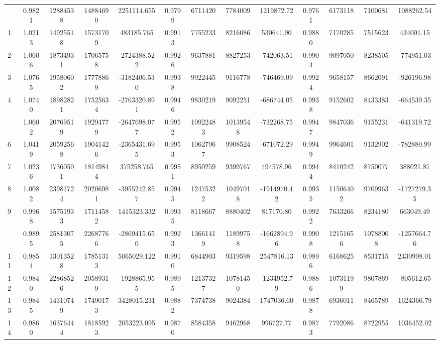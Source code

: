 \documentclass[
  12pt,
]{article}
\begin{document}
\begin{longtable}[t]{lcccccccccccc}
\endfoot
\bottomrule
\endlastfoot
0 & 0.9821 & 12884538 & 14884690 & 2251114.655 & 0.9799 & 6711420 & 7784009 & 1219872.72 & 0.9761 & 6173118 & 7100681 & 1088262.54\\
1 & 1.0213 & 14925518 & 15731709 & 483185.765 & 0.9913 & 7755233 & 8216086 & 530641.90 & 0.9880 & 7170285 & 7515623 & 434001.15\\
2 & 1.0606 & 18734931 & 17065758 & -2724388.522 & 0.9926 & 9637881 & 8827253 & -742063.51 & 0.9904 & 9097050 & 8238505 & -774951.03\\
3 & 1.0765 & 19580602 & 17778869 & -3182406.530 & 0.9938 & 9922445 & 9116778 & -746469.09 & 0.9924 & 9658157 & 8662091 & -926196.98\\
4 & 1.0740 & 18982821 & 17525634 & -2763320.891 & 0.9946 & 9830219 & 9092251 & -686744.05 & 0.9938 & 9152602 & 8433383 & -664539.35\\
\addlinespace
5 & 1.0602 & 20769519 & 19294779 & -2647698.077 & 0.9952 & 10922483 & 10139548 & -732268.75 & 0.9947 & 9847036 & 9155231 & -641319.72\\
6 & 1.0419 & 20592568 & 19041426 & -2365431.695 & 0.9953 & 10627967 & 9908524 & -671072.29 & 0.9949 & 9964601 & 9132902 & -782880.99\\
7 & 1.0236 & 17360501 & 18149844 & 375258.765 & 0.9951 & 8950259 & 9399767 & 494578.96 & 0.9944 & 8410242 & 8750077 & 388021.87\\
8 & 1.0082 & 23981724 & 20206981 & -3955242.857 & 0.9945 & 12475322 & 10497018 & -1914970.42 & 0.9935 & 11506402 & 9709963 & -1727279.35\\
9 & 0.9968 & 15751933 & 17114582 & 1415323.332 & 0.9935 & 8118667 & 8880402 & 817170.80 & 0.9922 & 7633266 & 8234180 & 663049.49\\
\addlinespace
10 & 0.9895 & 25813075 & 22687766 & -2869415.650 & 0.9923 & 13661419 & 11899758 & -1662894.96 & 0.9908 & 12151656 & 10788008 & -1257664.76\\
11 & 0.9854 & 13013528 & 17851313 & 5065029.122 & 0.9910 & 6844903 & 9319598 & 2547816.13 & 0.9896 & 6168625 & 8531715 & 2439998.01\\
12 & 0.9840 & 22868526 & 20589319 & -1928865.955 & 0.9895 & 12137327 & 10781450 & -1234952.79 & 0.9886 & 10731199 & 9807869 & -805612.65\\
13 & 0.9845 & 14310749 & 17490173 & 3428015.231 & 0.9882 & 7374738 & 9024384 & 1747036.60 & 0.9878 & 6936011 & 8465789 & 1624366.79\\
14 & 0.9860 & 16376444 & 18185923 & 2053223.095 & 0.9870 & 8584358 & 9462968 & 996727.77 & 0.9873 & 7792086 & 8722955 & 1036452.02\\

\end{longtable}
\end{document}
